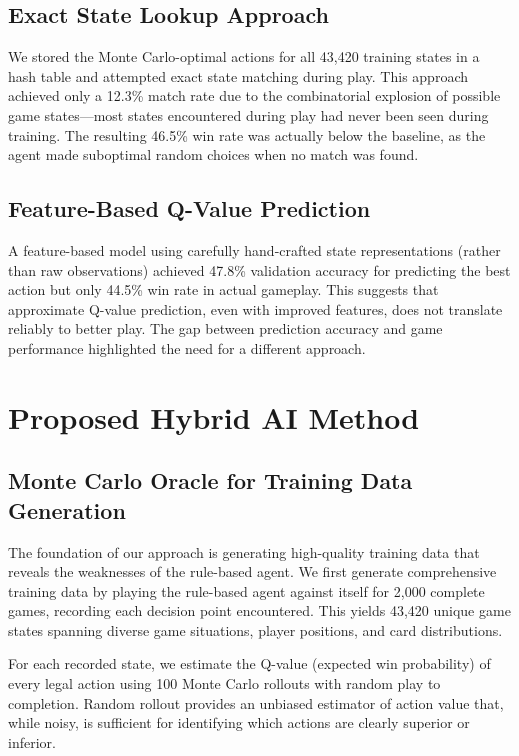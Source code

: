 \documentclass[conference]{IEEEtran}
\begin{document}
\subsection{Exact State Lookup Approach}

We stored the Monte Carlo-optimal actions for all 43,420 training states in a hash table and attempted exact state matching during play. This approach achieved only a 12.3\% match rate due to the combinatorial explosion of possible game states—most states encountered during play had never been seen during training. The resulting 46.5\% win rate was actually below the baseline, as the agent made suboptimal random choices when no match was found.

\subsection{Feature-Based Q-Value Prediction}

A feature-based model using carefully hand-crafted state representations (rather than raw observations) achieved 47.8\% validation accuracy for predicting the best action but only 44.5\% win rate in actual gameplay. This suggests that approximate Q-value prediction, even with improved features, does not translate reliably to better play. The gap between prediction accuracy and game performance highlighted the need for a different approach.

\section{Proposed Hybrid AI Method}

\subsection{Monte Carlo Oracle for Training Data Generation}

The foundation of our approach is generating high-quality training data that reveals the weaknesses of the rule-based agent. We first generate comprehensive training data by playing the rule-based agent against itself for 2,000 complete games, recording each decision point encountered. This yields 43,420 unique game states spanning diverse game situations, player positions, and card distributions.

For each recorded state, we estimate the Q-value (expected win probability) of every legal action using 100 Monte Carlo rollouts with random play to completion. Random rollout provides an unbiased estimator of action value that, while noisy, is sufficient for identifying which actions are clearly superior or inferior.
\end{document}
